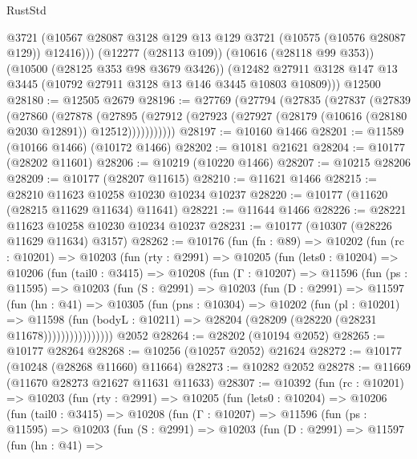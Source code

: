 \begin{lexlean}{RustStd}
\begin{coremodule}
          @3721
          (@10567 @28087 @3128 @129 @13 @129 @3721 (@10575 (@10576 @28087 @129)) @12416)))
      (@12277 (@28113 @109))
      (@10616 (@28118 @99 @353))
      (@10500 (@28125 @353 @98 @3679 @3426))
      (@12482 @27911 @3128 @147 @13 @3445 (@10792 @27911 @3128 @13 @146 @3445 @10803 @10809)))
    @12500
@28180 := @12505 @2679
@28196 := @27769
    (@27794
      (@27835
        (@27837
          (@27839
            (@27860
              (@27878
                (@27895
                  (@27912 (@27923 (@27927 (@28179 (@10616 (@28180 @2030 @12891)) @12512)))))))))))
@28197 := @10160 @1466
@28201 := @11589 (@10166 @1466) (@10172 @1466)
@28202 := @10181 @21621
@28204 := @10177 (@28202 @11601)
@28206 := @10219 (@10220 @1466)
@28207 := @10215 @28206
@28209 := @10177 (@28207 @11615)
@28210 := @11621 @1466
@28215 := @28210 @11623 @10258 @10230 @10234 @10237
@28220 := @10177 (@11620 (@28215 @11629 @11634) @11641)
@28221 := @11644 @1466
@28226 := @28221 @11623 @10258 @10230 @10234 @10237
@28231 := @10177 (@10307 (@28226 @11629 @11634) @3157)
@28262 := @10176
    (fun (fn : @89) =>
    @10202
      (fun (rc : @10201) =>
      @10203
        (fun (rty : @2991) =>
        @10205
          (fun (lets0 : @10204) =>
          @10206
            (fun (tail0 : @3415) =>
            @10208
              (fun (Γ : @10207) =>
              @11596
                (fun (ps : @11595) =>
                @10203
                  (fun (S : @2991) =>
                  @10203
                    (fun (D : @2991) =>
                    @11597
                      (fun (hn : @41) =>
                      @10305
                        (fun (pns : @10304) =>
                        @10202
                          (fun (pl : @10201) =>
                          @11598
                            (fun (bodyL : @10211) =>
                            @28204 (@28209 (@28220 (@28231 @11678))))))))))))))))
    @2052
@28264 := @28202 (@10194 @2052)
@28265 := @10177 @28264
@28268 := @10256 (@10257 @2052) @21624
@28272 := @10177 (@10248 (@28268 @11660) @11664)
@28273 := @10282 @2052
@28278 := @11669 (@11670 @28273 @21627 @11631 @11633)
@28307 := @10392
    (fun (rc : @10201) =>
    @10203
      (fun (rty : @2991) =>
      @10205
        (fun (lets0 : @10204) =>
        @10206
          (fun (tail0 : @3415) =>
          @10208
            (fun (Γ : @10207) =>
            @11596
              (fun (ps : @11595) =>
              @10203
                (fun (S : @2991) =>
                @10203
                  (fun (D : @2991) =>
                  @11597
                    (fun (hn : @41) =>

\end{coremodule}
\end{lexlean}
